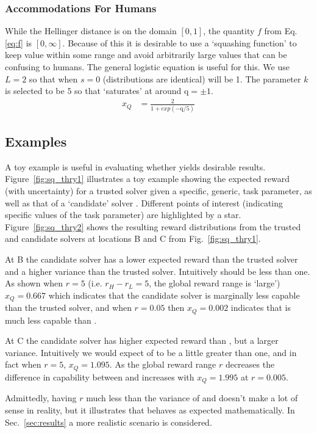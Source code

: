 \subsubsection{Accommodations For Humans}
While the Hellinger distance is on the domain $[0,1]$, the quantity $f$ from Eq. \ref{eq:f} is $[0,\infty]$. Because of this it is desirable to use a `squashing function' to keep \xQ{} value within some range and avoid arbitrarily large values that can be confusing to humans. The general logistic equation is useful for this.
We use $L=2$ so that when $s=0$ (distributions are identical) \xQ{} will be 1. The parameter $k$ is selected to be $5$ so that \xQ{} `saturates' at around $\text{q}=\pm1$.
\begin{align}
    x_{Q} &= \frac{2}{1+exp(-\text{q}/5)}\label{eq:SQ}
\end{align}

\subsection{Examples}
A toy example is useful in evaluating whether \xQ{} yields desirable results. Figure~\ref{fig:sq_thry1} illustrates a toy example showing the expected reward (with uncertainty) for a trusted solver \solvestar{} given a specific, generic, task parameter, as well as that of a `candidate' solver \solve. Different points of interest (indicating specific values of the task parameter) are highlighted by a star. Figure~\ref{fig:sq_thry2} shows the resulting reward distributions from the trusted and candidate solvers at locations B and C from Fig.~\ref{fig:sq_thry1}.

At B the candidate solver has a lower expected reward than the trusted solver and a higher variance than the trusted solver. Intuitively \xQ{} should be less than one. As shown when $r=5$ (i.e. $r_H-r_L=5$, the global reward range is `large') $x_Q=0.667$ which indicates that the candidate solver is marginally less capable than the trusted solver, and when $r=0.05$ then $x_Q=0.002$ indicates that \solve{} is much less capable than \solvestar.

At C the candidate solver \solve{} has higher expected reward than \solvestar, but a larger variance. Intuitively we would expect \xQ{} of \solve{} to be a little greater than one, and in fact when $r=5$, $x_Q=1.095$. As the global reward range $r$ decreases the difference in capability between \solve{} and \solvestar{} increases with $x_Q=1.995$ at $r=0.005$.

Admittedly, having $r$ much less than the variance of \solve{} and \solvestar{} doesn't make a lot of sense in reality, but it illustrates that \xQ{} behaves as expected mathematically. In Sec.~\ref{sec:results} a more realistic scenario is considered.

